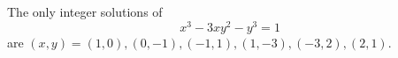 \begin{proposition}
    The only integer solutions of
\[
    x^3-3xy^2-y^3=1
\]
    are $(x,y)=(1,0),(0,-1),(-1,1),(1,-3),(-3,2),(2,1)$.
\end{proposition}
